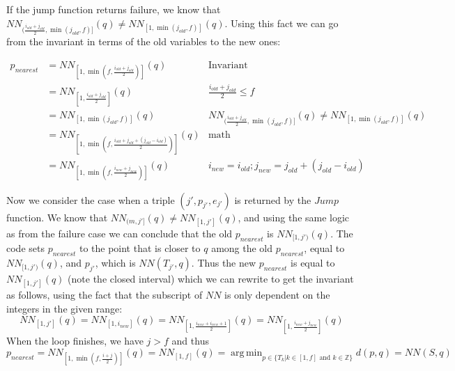\documentclass[10pt,a4paper]{amsart}
\newcommand{\NN}{\mathit{NN}}
\newcommand{\old}{\mathit{old}}
\newcommand{\new}{\mathit{new}}
\DeclareMathOperator*{\argmin}{arg\,min}
\begin{document}
If the jump function returns failure, we know that
$\NN_{(\frac{i_{\old}+j_{\old}}{2},\min(j_{\old},f)]}(q) \not = \NN_{[1,\min(j_{\old},f)]}(q)$. Using this fact we can go from the invariant in terms of the old variables to the new ones:


\begin{align*}
p_{nearest}&=\NN_{[1,\min(f,\frac{i_{\old}+j_{\old}}{2})]}(q)&
\text{Invariant}
\\
&=\NN_{[1,\frac{i_{\old}+j_{\old}}{2}]}(q)
& \frac{i_{\old}+j_{\old}}{2} \leq  f
\\
&=\NN_{[1,\min(j_{\old},f)]}(q)
& \NN_{(\frac{i_{\old}+j_{\old}}{2},\min(j_{\old},f)]}(q) \not = \NN_{[1,\min(j_{\old},f)]}(q)
\\
 & =\NN_{[1,\min(f,\frac{i_{\old}+j_{\old}+(j_{\old}-i_{\old})}{2})]}(q)
 &
\text{math}
\\
 & =\NN_{[1,\min(f,\frac{i_{\new}+j_{\new}}{2})]}(q)
 & i_{\new}=i_{\old};j_{\new}=j_{\old}+(j_{\old}-i_{\old})
\end{align*}

Now we consider the case when  a triple $(j',p_{j'},e_{j'})$ is returned by the $Jump$ function. We know that $\NN_{(m,j']}(q) \not = \NN_{[1,j']}(q)$, and using the same logic as from the failure case we can conclude that the old $p_{nearest}$ is
$\NN_{[1,j')}(q)$. The code sets $p_{nearest}$ to the point that is closer to $q$ among the old $p_{nearest}$, equal to $\NN_{[1,j')}(q)$, and $p_{j'}$, which is $\NN(T_{j'},q)$.
Thus the new $p_{nearest}$ is equal to $\NN_{[1,j']}(q)$ (note the closed interval) which we can rewrite to get the invariant as follows, using the fact that the subscript of $\NN$ is only dependent on the integers in the given range:
\[    \NN_{[1,j']}(q)
    =     \NN_{[1,i_{\new}]}(q)
    =     \NN_{[1,\frac{i_{\new}+i_{\new}+1}{2}]}(q)
    =     \NN_{[1,\frac{i_{\new}+j_{\new}}{2}]}(q)
\]%
When the loop finishes, we have $j>f$ and thus
%
\[p_{nearest} 
= \NN_{[1,\min (f,\frac{i+j}{2})]}(q)
= \NN_{[1,f]}(q)
= \argmin_{p\in \{ T_k|k\in [1,f]  \text{ and } k \in \mathbb{Z}\}}d(p,q)
= \NN(S,q)
\]
\end{document}
